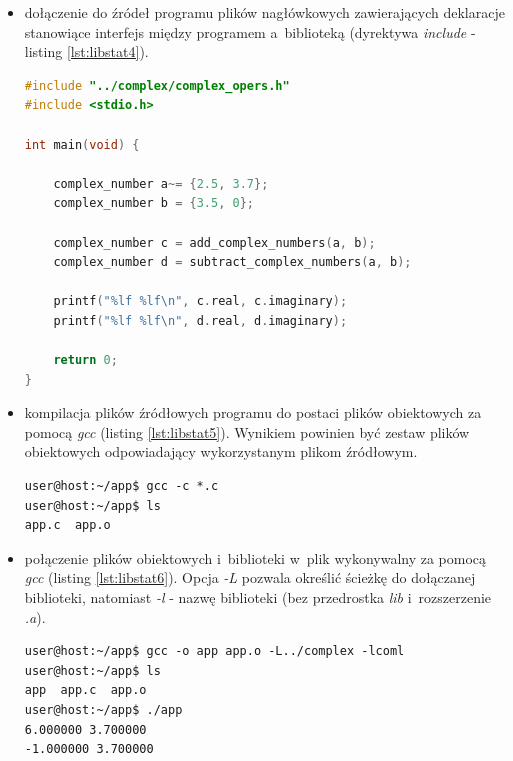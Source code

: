 \begin{itemize}
\item dołączenie do źródeł programu plików nagłówkowych zawierających deklaracje stanowiące interfejs między programem a~biblioteką (dyrektywa \textit{include} - listing \ref{lst:libstat4}).

\begin{lstlisting}[language=c++, caption={Plik \textit{app.c} zawierający dyrektywę \textit{include} dołączającą plik nagłówkowy zawierający deklaracje funkcji z~biblioteki statycznej},label={lst:libstat4}]
#include "../complex/complex_opers.h"
#include <stdio.h>

int main(void) {

    complex_number a~= {2.5, 3.7};
    complex_number b = {3.5, 0};

    complex_number c = add_complex_numbers(a, b);
    complex_number d = subtract_complex_numbers(a, b);

    printf("%lf %lf\n", c.real, c.imaginary);
    printf("%lf %lf\n", d.real, d.imaginary);

    return 0;
}
\end{lstlisting}

\item kompilacja plików źródłowych programu do postaci plików obiektowych za pomocą \textit{gcc} (listing \ref{lst:libstat5}). Wynikiem powinien być zestaw plików obiektowych odpowiadający wykorzystanym plikom źródłowym.

\begin{lstlisting}[language=Cmd, caption={Kompilacja plików źródłowych głównego programu do postaci obiektowej.},label={lst:libstat5}]
user@host:~/app$ gcc -c *.c
user@host:~/app$ ls
app.c  app.o
\end{lstlisting}


\item połączenie plików obiektowych i~biblioteki w~plik wykonywalny za pomocą \textit{gcc} (listing \ref{lst:libstat6}). Opcja \textit{-L} pozwala określić ścieżkę do dołączanej biblioteki, natomiast \textit{-l} - nazwę biblioteki (bez przedrostka \textit{lib} i~rozszerzenie \textit{.a}).

\begin{lstlisting}[language=Cmd, caption={Linkowanie plików obiektowych programu z~biblioteką statyczną, wynik uruchomienia programu obrazuący poprawne działanie przykładu.},label={lst:libstat6}]
user@host:~/app$ gcc -o app app.o -L../complex -lcoml
user@host:~/app$ ls
app  app.c  app.o
user@host:~/app$ ./app
6.000000 3.700000
-1.000000 3.700000
\end{lstlisting}

\end{itemize}



